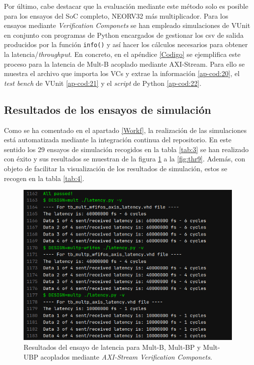 Por último, cabe destacar que la evaluación mediante este método solo es posible para los ensayos del SoC completo, NEORV32 más multiplicador.
Para los ensayos mediante \textit{Verification Componets} se han empleado simulaciones de VUnit en conjunto con programas de Python encargados de gestionar los csv de salida producidos por la función \texttt{info()} y así hacer los cálculos necesarios para obtener la latencia/\textit{throughput}.
En concreto, en el apéndice \ref{Codigo} se ejemplifica este proceso para la latencia de Mult-B acoplado mediante AXI-Stream.
Para ello se muestra el archivo que importa los VCs y extrae la información \ref{ap-cod:20}, el \textit{test bench} de VUnit \ref{ap-cod:21} y el \textit{script} de Python \ref{ap-cod:22}.

\subsection{Resultados de los ensayos de simulación}


Como se ha comentado en el apartado \ref{Workf}, la realización de las simulaciones está automatizada mediante la integración continua del repositorio.
En este sentido los 29 ensayos de simulación recogidos en la tabla \ref{tab:3} se han realizado con éxito y sus resultados se muestran de la figura \ref{fig:lat1} a la \ref{fig:thr9}.
Además, con objeto de facilitar la visualización de los resultados de simulación, estos se recogen en la tabla \ref{tab:4}.

\begin{figure}[H]
    \centering
    \includegraphics[width=14cm]{Figuras/result/lat1.png}
    \caption{Resultados del ensayo de latencia para Mult-B, Mult-BP y Mult-UBP acoplados mediante \textit{AXI-Stream Verification Componets}.}
    \label{fig:lat1}
\end{figure}

